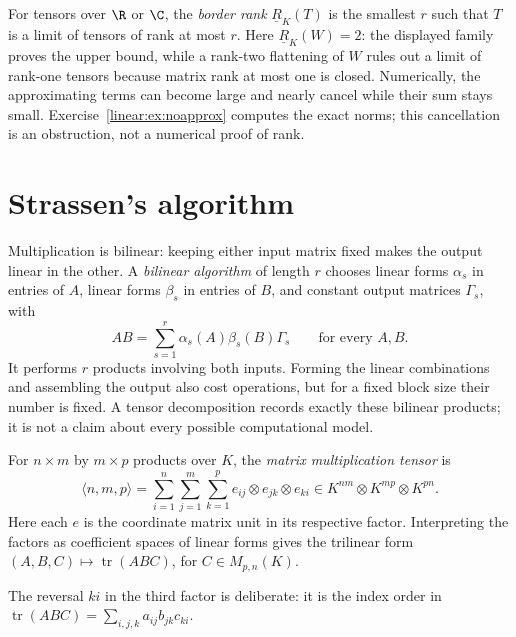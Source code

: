 For tensors over $\R$ or $\C$, the \emph{border rank} $\underline R_K(T)$ is the smallest $r$ such that $T$ is a limit of tensors of rank at most $r$. Here $\underline R_K(W)=2$: the displayed family proves the upper bound, while a rank-two flattening of $W$ rules out a limit of rank-one tensors because matrix rank at most one is closed. Numerically, the approximating terms can become large and nearly cancel while their sum stays small. Exercise~\ref{linear:ex:noapprox} computes the exact norms; this cancellation is an obstruction, not a numerical proof of rank.

\section{Strassen's algorithm}

Multiplication is bilinear: keeping either input matrix fixed makes the output linear in the other. A \emph{bilinear algorithm} of length $r$ chooses linear forms $\alpha_s$ in entries of $A$, linear forms $\beta_s$ in entries of $B$, and constant output matrices $\Gamma_s$, with
\[
AB=\sum_{s=1}^r\alpha_s(A)\beta_s(B)\Gamma_s
\qquad\text{for every }A,B.
\]
It performs $r$ products involving both inputs. Forming the linear combinations and assembling the output also cost operations, but for a fixed block size their number is fixed. A tensor decomposition records exactly these bilinear products; it is not a claim about every possible computational model.

\begin{definition}\label{linear:def:mmtensor}
For $n\times m$ by $m\times p$ products over $K$, the \emph{matrix multiplication tensor} is
\[
\langle n,m,p\rangle
 =\sum_{i=1}^n\sum_{j=1}^m\sum_{k=1}^p
 e_{ij}\otimes e_{jk}\otimes e_{ki}
 \in K^{nm}\otimes K^{mp}\otimes K^{pn}.
\]
Here each $e$ is the coordinate matrix unit in its respective factor. Interpreting the factors as coefficient spaces of linear forms gives the trilinear form $(A,B,C)\mapsto\operatorname{tr}(ABC)$, for $C\in M_{p,n}(K)$.
\end{definition}

The reversal $ki$ in the third factor is deliberate: it is the index order in $\operatorname{tr}(ABC)=\sum_{i,j,k}a_{ij}b_{jk}c_{ki}$.

